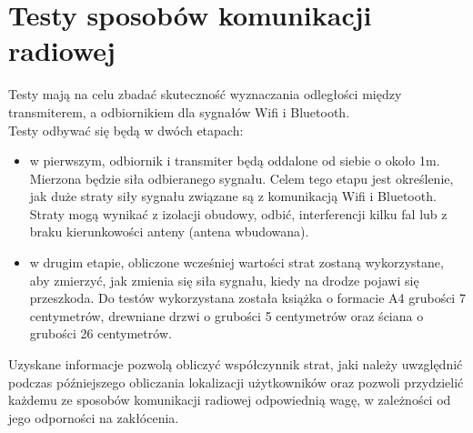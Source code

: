 \chapter{Testy sposobów komunikacji radiowej}
\label{cha:teoria}

Testy mają na celu zbadać skuteczność wyznaczania odległości między transmiterem, a odbiornikiem dla sygnałów Wifi i Bluetooth.\\
Testy odbywać się będą w dwóch etapach:
\begin{itemize}
	\item w pierwszym, odbiornik i transmiter będą oddalone od siebie o około 1m. Mierzona będzie siła odbieranego sygnału. Celem tego etapu jest określenie, jak duże straty siły sygnału związane są z komunikacją Wifi i Bluetooth. Straty mogą wynikać z izolacji obudowy, odbić, interferencji kilku fal lub z braku kierunkowości anteny (antena wbudowana).
	\item w drugim etapie, obliczone wcześniej wartości strat zostaną wykorzystane, aby zmierzyć, jak zmienia się siła sygnału, kiedy na drodze pojawi się przeszkoda. Do testów wykorzystana została książka o formacie A4 grubości 7 centymetrów, drewniane drzwi o grubości 5 centymetrów oraz ściana o grubości 26 centymetrów.
\end{itemize}
Uzyskane informacje pozwolą obliczyć współczynnik strat, jaki należy uwzględnić podczas późniejszego obliczania lokalizacji użytkowników oraz pozwoli przydzielić każdemu ze sposobów komunikacji radiowej odpowiednią wagę, w zależności od jego odporności na zakłócenia.
